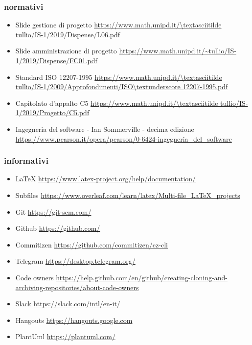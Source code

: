 \documentclass[../norme-di-progetto.tex]{subfiles}
\begin{document}
\subsubsection{normativi}
\label{subs:normativi}
\begin{itemize}
	\item Slide gestione di progetto 
	\newline \url{https://www.math.unipd.it/\textasciitilde tullio/IS-1/2019/Dispense/L06.pdf}
	\item Slide amministrazione di progetto
	\newline \url{https://www.math.unipd.it/~tullio/IS-1/2019/Dispense/FC01.pdf}
	\item Standard ISO 12207-1995 
	\newline \url{https://www.math.unipd.it/\textasciitilde tullio/IS-1/2009/Approfondimenti/ISO\textunderscore 12207-1995.pdf}
	\item Capitolato d'appalto C5 
	\newline \url{https://www.math.unipd.it/\textasciitilde tullio/IS-1/2019/Progetto/C5.pdf}
	\item Ingegneria del software - Ian Sommerville - decima edizione
	\newline \url{https://www.pearson.it/opera/pearson/0-6424-ingegneria_del_software}
\end{itemize}
\subsubsection{informativi}
\label{subs:riferimenti informativi}
\begin{itemize}
	\item LaTeX
	\newline \url{https://www.latex-project.org/help/documentation/}
	\item Subfiles
	\newline \url{https://www.overleaf.com/learn/latex/Multi-file_LaTeX_projects}
	\item Git
	\newline \url{https://git-scm.com/}
	\item Github
	\newline \url{https://github.com/}
	\item Commitizen
	\newline \url{https://github.com/commitizen/cz-cli}
	\item Telegram
	\newline \url{https://desktop.telegram.org/}
	\item Code owners
	\newline \url{https://help.github.com/en/github/creating-cloning-and-archiving-repositories/about-code-owners}
	\item Slack
	\newline \url{https://slack.com/intl/en-it/}
	\item Hangouts
    \newline \url{https://hangouts.google.com}
    \item PlantUml
    \newline \url{https://plantuml.com/}
\end{itemize}
\end{document}
